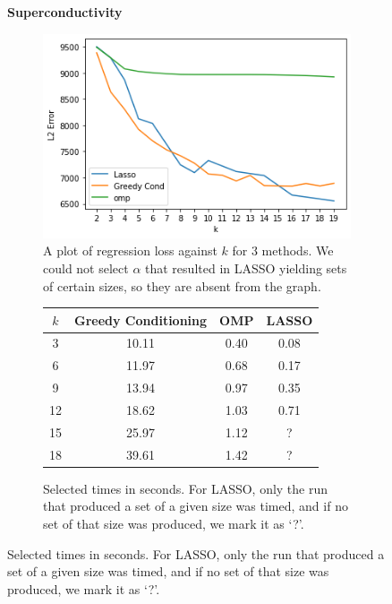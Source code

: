 \documentclass{amsart}
\theoremstyle{definition}
\begin{document}
\begin{figure}[H]
    \centering
    \textbf{Superconductivity}\par\medskip
    \begin{subfigure}[b]{0.4\textwidth}
        \includegraphics[width=\textwidth]{superconductivity.png}
        \caption{A plot of regression loss against $k$ for 3 methods. We could not select $\alpha$ that resulted in LASSO yielding sets of certain sizes, so they are absent from the graph.}
    \end{subfigure}
    \begin{subfigure}[b]{0.4\textwidth}
        \begin{tabular}{c c c c}
            $k$ & Greedy Conditioning & OMP & LASSO \\
            \hline
            3 & 10.11 & 0.40 & 0.08\\
            6 & 11.97 & 0.68 & 0.17\\
            9 & 13.94 & 0.97 & 0.35\\
            12 & 18.62 & 1.03 & 0.71\\
            15 & 25.97 & 1.12 & ?\\
            18 & 39.61 & 1.42 & ?\\
            \hline
        \end{tabular}
        \vspace{0.5in}
        \caption{Selected times in seconds. For LASSO, only the run that produced a set of a given size was timed, and if no set of that size was produced, we mark it as `?'.}
    \end{subfigure}
\end{figure}
\end{document}
